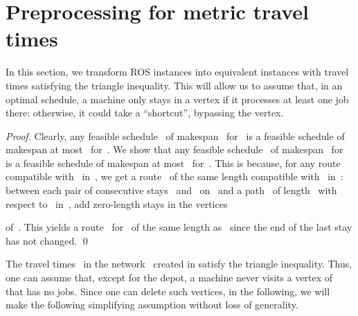 \documentclass[natbib,sort,smallextended,envcountsame,envcountsect,numbook]{svjour3}
\newcommand{\ROS}{\textsc{ROS}}
\begin{document}
\section{Preprocessing for metric travel times}\label{sec:preprop}
\noindent
In this section,
we transform \ROS{} instances
into equivalent instances
with travel times
satisfying the triangle inequality.
This will allow us to assume that,
in an optimal schedule,
a machine only stays in a vertex
if it processes at least one job there:
otherwise, it could take a ``shortcut'',
bypassing the vertex.


\begin{proof}
  Clearly, any feasible schedule~ of makespan~ for~
  is a feasible schedule of makespan at most~ for~. We show that any feasible schedule~ of makespan~ for~
  is a feasible schedule of makespan at most~ for~.
  This is because, for any route~ compatible with~
  in~,
  we get a route~ of the same length compatible with~ in~:
  between each pair of consecutive
  stays~ and~ on~
  and a path~
  of length~
  with respect to~  in~,
  add zero-length stays in the vertices
  
  of~.  This yields a route~ for~
  of the same length as~ since the end of the last stay has not changed.
\qed\end{proof}

\noindent
The travel times~
in the network~ created in 
satisfy the triangle inequality.
Thus,
one can assume that, except for the depot, a machine
never visits a vertex of~ that has no jobs.
Since one can delete such vertices,
in the following,
we will make the
following simplifying assumption without loss of generality.

\end{document}
